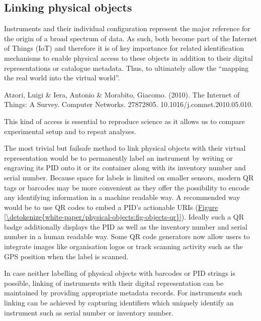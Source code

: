 \documentclass[a4paper,10pt,english]{sphinxmanual}
\begin{document}
\subsection{Linking physical objects}
\label{\detokenize{white-paper/physical-objects:linking-physical-objects}}\label{\detokenize{white-paper/physical-objects::doc}}
\sphinxAtStartPar
Instruments and their individual configuration represent the major
reference for the origin of a broad spectrum of data. As such, both
become part of the Internet of Things (IoT) and therefore it is of key
importance for related identification mechanisms to enable physical
access to these objects in addition to their digital representations or
catalogue metadata. Thus, to ultimately allow the “mapping the real
world into the virtual world”.%
\begin{footnote}[1]\sphinxAtStartFootnote
Atzori, Luigi \& Iera, Antonio \& Morabito, Giacomo. (2010). The
Internet of Things: A Survey. Computer Networks. 2787\sphinxhyphen{}2805.
10.1016/j.comnet.2010.05.010.
%
\end{footnote} This kind of access is
essential to reproduce science as it allows us to compare experimental
setup and to repeat analyses.

\sphinxAtStartPar
The most trivial but failsafe method to link physical objects with their
virtual representation would be to permanently label an instrument by
writing or engraving its PID onto it or its container along with its
inventory number and serial number. Because space for labels is limited
on smaller sensors, modern QR tags or barcodes may be more convenient as
they offer the possibility to encode any identifying information in a
machine readable way. A recommended way would be to use QR codes to
embed a PID’s actionable URIs (\hyperref[\detokenize{white-paper/physical-objects:fig-objects-qr}]{Figure \ref{\detokenize{white-paper/physical-objects:fig-objects-qr}}}). Ideally such
a QR badge additionally displays the PID as well as the inventory
number and serial number in a human readable way. Some QR code
generators now allow users to integrate images like organisation logos
or track scanning activity such as the GPS position when the label is
scanned.

\sphinxAtStartPar
In case neither labelling of physical objects with barcodes or PID
strings is possible, linking of instruments with their digital
representation can be maintained by providing appropriate metadata
records. For instruments such linking can be achieved by capturing
identifiers which uniquely identify an instrument such as serial number
or inventory number.
\end{document}
